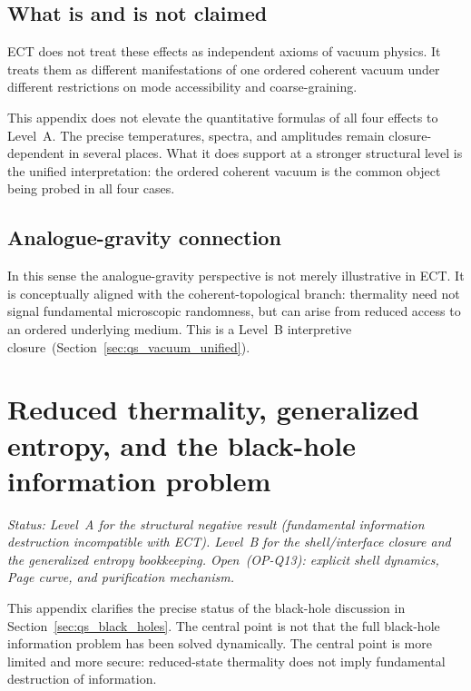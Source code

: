 \documentclass[11pt,a4paper]{article}
\numberwithin{equation}{section}
\begin{document}
\subsection*{What is and is not claimed}

ECT does not treat these effects as independent axioms of vacuum physics.
It treats them as different manifestations of one ordered coherent vacuum
under different restrictions on mode accessibility and coarse-graining.

This appendix does not elevate the quantitative formulas of all four
effects to Level~A.
The precise temperatures, spectra, and amplitudes remain
closure-dependent in several places.
What it does support at a stronger structural level is the unified
interpretation: the ordered coherent vacuum is the common object being
probed in all four cases.

\subsection*{Analogue-gravity connection}

In this sense the analogue-gravity perspective is not merely illustrative
in ECT.
It is conceptually aligned with the coherent-topological branch:
thermality need not signal fundamental microscopic randomness, but can
arise from reduced access to an ordered underlying medium.
This is a Level~B interpretive closure~(Section~\ref{sec:qs_vacuum_unified}).

\section{Reduced thermality, generalized entropy, and the
black-hole information problem}
\label{app:bh_reduced_thermality}

\textit{Status: Level~A for the structural negative result (fundamental
information destruction incompatible with ECT).
Level~B for the shell/interface closure and the generalized entropy
bookkeeping.
Open~(OP-Q13): explicit shell dynamics, Page curve, and purification
mechanism.}

\medskip
This appendix clarifies the precise status of the black-hole discussion
in Section~\ref{sec:qs_black_holes}.
The central point is not that the full black-hole information problem
has been solved dynamically.
The central point is more limited and more secure: reduced-state
thermality does not imply fundamental destruction of information.
\end{document}
